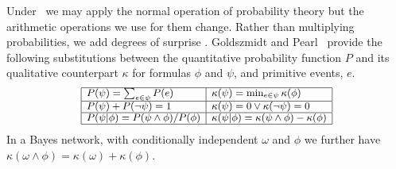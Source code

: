 Under \zplus\ we may apply the normal operation
of probability theory
but the arithmetic operations we use for them change.  Rather than multiplying
probabilities, we add degrees of surprise%
.  Goldszmidt and
Pearl~ provide the following substitutions
between the quantitative probability function $P$ and its qualitative
counterpart $\kappa$ for formulas $\phi$ and $\psi$, and primitive events, $e$.
\begin{displaymath}
  \small
  \begin{array}{|l|l|}
    \hline
  P(\psi) = \sum_{e \in \psi} P(e) & \kappa(\psi) =
  \operatorname{min}_{e \in \psi} \kappa(\phi) \\ \hline
  P(\psi) + P(\neg \psi) = 1 & \kappa(\psi) = 0 \vee \kappa(\neg \psi) = 0
  \\ \hline
  P(\psi | \phi) = P(\psi \wedge \phi) / P(\phi) &
  \kappa(\psi | \phi) = \kappa(\psi \wedge \phi) - \kappa(\phi)
  \\ \hline
\end{array}
\end{displaymath}
\noindent
In a Bayes network, with conditionally independent $\omega$ and
$\phi$ we further have $\kappa(\omega \wedge \phi) = \kappa(\omega) + \kappa(\phi)$.

